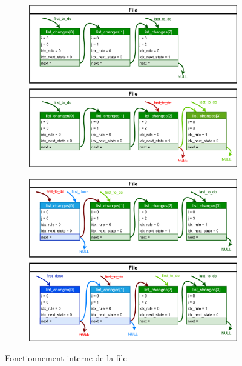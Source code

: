 \begin{figure}[ht]
\centering
\begin{subfigure}{0.45\textwidth}
    \includegraphics[width=\textwidth]{queue_append.png}
    \label{fig:QueueAppend}
\end{subfigure}
\hfill
\begin{subfigure}{0.45\textwidth}
    \includegraphics[width=\textwidth]{queue_pop.png}
    \label{fig:QueueRemove}
\end{subfigure}
    \caption{Fonctionnement interne de la file}
    \label{fig:Queue}
\end{figure}

